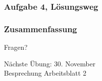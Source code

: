 \documentclass[c,18pt]{beamer}
\begin{document}
\begin{frame}[t]%
  \frametitle{Aufgabe 4, Lösungsweg}%
\medskip


\end{frame}


\def\kap{7}%



\begin{frame}
  \frametitle{Zusammenfassung}%
\tableofcontents[current]
\end{frame}

\begin{frame}
\centering
\Huge\textcolor{KITgreen}{Fragen?}
\vspace{2cm}

{\LARGE
N\"achste \"Ubung: 30. November\\
Besprechung Arbeitsblatt 2
}
\end{frame}


\end{document}
